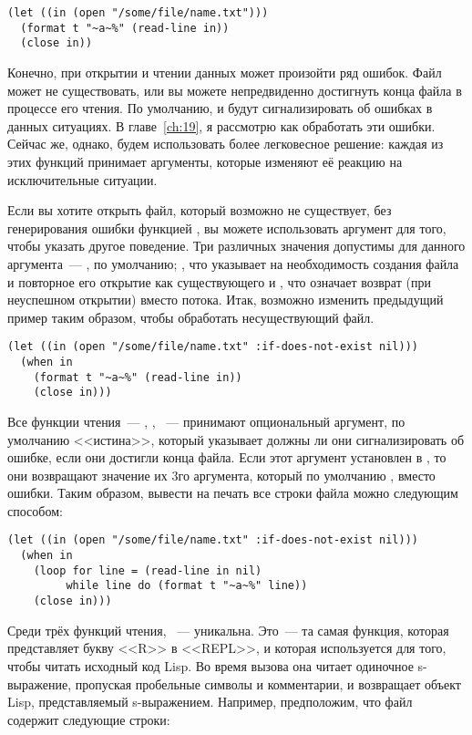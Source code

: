 \begin{lstlisting}
(let ((in (open "/some/file/name.txt")))
  (format t "~a~%" (read-line in))
  (close in))
\end{lstlisting}

Конечно, при открытии и чтении данных может произойти ряд ошибок. Файл может не
существовать, или вы можете непредвиденно достигнуть конца файла в процессе его чтения. По
умолчанию,  и  будут сигнализировать об ошибках в данных
ситуациях. В главе~\ref{ch:19}, я рассмотрю как обработать эти ошибки. Сейчас же, однако, будем
использовать более легковесное решение: каждая из этих функций принимает аргументы,
которые изменяют её реакцию на исключительные ситуации.

Если вы хотите открыть файл, который возможно не существует, без генерирования ошибки
функцией , вы можете использовать аргумент  для того,
чтобы указать другое поведение. Три различных значения допустимы для данного аргумента~---
, по умолчанию; , что указывает на необходимость создания файла
и повторное его открытие как существующего и , что означает возврат 
(при неуспешном открытии) вместо потока. Итак, возможно изменить предыдущий пример таким
образом, чтобы обработать несуществующий файл.

\begin{lstlisting}
(let ((in (open "/some/file/name.txt" :if-does-not-exist nil)))
  (when in
    (format t "~a~%" (read-line in))
    (close in)))
\end{lstlisting}

Все функции чтения~--- , , ~--- принимают
опциональный аргумент, по умолчанию <<истина>>, который указывает должны ли они
сигнализировать об ошибке, если они достигли конца файла. Если этот аргумент установлен в
, то они возвращают значение их 3го аргумента, который по умолчанию ,
вместо ошибки. Таким образом, вывести на печать все строки файла можно следующим способом:

\begin{lstlisting}
(let ((in (open "/some/file/name.txt" :if-does-not-exist nil)))
  (when in
    (loop for line = (read-line in nil)
         while line do (format t "~a~%" line))
    (close in)))
\end{lstlisting}

Среди трёх функций чтения, ~--- уникальна. Это~--- та самая функция, которая
представляет букву <<R>> в <<REPL>>, и которая используется для того, чтобы читать исходный
код Lisp. Во время вызова она читает одиночное s-выражение, пропуская пробельные символы и
комментарии, и возвращает объект Lisp, представляемый s-выражением. Например, предположим,
что файл  содержит следующие строки:

